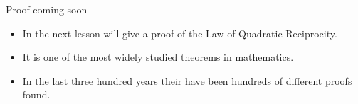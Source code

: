 \documentclass{beamer}
\begin{document}

\begin{frame}{Proof coming soon}

\begin{itemize}
  \item In the next lesson will give a proof of the Law of Quadratic Reciprocity.
  \item It is one of the most widely studied theorems in mathematics.
  \item In the last three hundred years their have been hundreds of different proofs found.
\end{itemize}
\end{frame}
\end{document}
